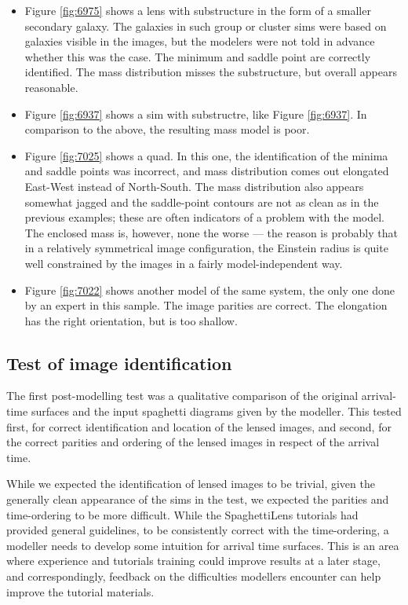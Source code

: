 \documentclass[usenatbib]{mn2e}
\newcommand{\spl}{SpaghettiLens\xspace}
\begin{document}
\begin{itemize}
\item Figure \ref{fig:6975} shows a lens with substructure in the form
  of a smaller secondary galaxy.  The galaxies in such group or
  cluster sims were based on galaxies visible in the images, but the
  modelers were not told in advance whether this was the case.  The
  minimum and saddle point are correctly identified.  The mass
  distribution misses the substructure, but overall appears
  reasonable.

\item Figure \ref{fig:6937} shows a sim with substructre, like
  Figure \ref{fig:6937}. In comparison to the above, the resulting mass
  model is poor.

\item Figure \ref{fig:7025} shows a quad.  In this one, the
  identification of the minima and saddle points was incorrect, and
  mass distribution comes out elongated East-West instead of
  North-South.  The mass distribution also appears somewhat jagged and
  the saddle-point contours are not as clean as in the previous
  examples; these are often indicators of a problem with the model.
  The enclosed mass is, however, none the worse --- the reason is
  probably that in a relatively symmetrical image configuration, the
  Einstein radius is quite well constrained by the images in a fairly
  model-independent way.

\item Figure \ref{fig:7022} shows another model of the same system, the
  only one done by an expert in this sample. The image parities are
  correct. The elongation has the right orientation, but is too shallow.

\end{itemize}



\subsection{Test of image identification} \label{sec:tests.t1}

The first post-modelling test was a qualitative comparison of the
original arrival-time surfaces and the input spaghetti diagrams given
by the modeller.  This tested first, for correct identification and
location of the lensed images, and second, for the correct parities and
ordering of the lensed images in respect of the arrival time.

While we expected the identification of lensed images to be trivial,
given the generally clean appearance of the sims in the test, we
expected the parities and time-ordering to be more difficult.  While
the \spl tutorials had provided general guidelines, to be consistently
correct with the time-ordering, a modeller needs to develop some
intuition for arrival time surfaces.  This is an area where experience
and tutorials training could improve results at a later stage, and
correspondingly, feedback on the difficulties modellers encounter can
help improve the tutorial materials.
\end{document}
